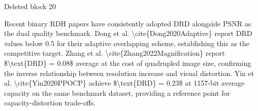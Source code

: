 \documentclass[a4paper,fleqn]{cas-dc}
\newenvironment{RevisionDeletion}{%
  \par\begingroup\color{revisionred}\footnotesize\ttfamily
  \setlength{\parindent}{0pt}\setlength{\parskip}{1pt}\obeyspaces
}{\par\endgroup}
\begin{document}
\begin{RevisionDeletion}
Deleted block 20\par
Recent binary RDH papers have consistently adopted DRD alongside PSNR as the dual quality benchmark. Dong et al. \textbackslash{}cite\{Dong2020Adaptive\} report DRD values below 0.5 for their adaptive overlapping scheme, establishing this as the competitive target. Zhang et al. \textbackslash{}cite\{Zhang2022Magnification\} report \$\textbackslash{}text\{DRD\} = 0.08\$ average at the cost of quadrupled image size, confirming the inverse relationship between resolution increase and visual distortion. Yin et al. \textbackslash{}cite\{Yin2020PPOCP\} achieve \$\textbackslash{}text\{DRD\} = 0.23\$ at 1157-bit average capacity on the same benchmark dataset, providing a reference point for capacity-distortion trade-offs.\par
\end{RevisionDeletion}
\end{document}

